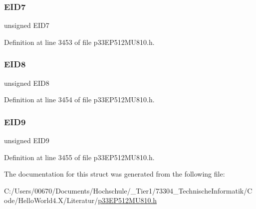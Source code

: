 \subsubsection{\texorpdfstring{E\+I\+D7}{EID7}}
{\footnotesize\ttfamily unsigned E\+I\+D7}



Definition at line 3453 of file p33\+E\+P512\+M\+U810.\+h.

\mbox{\label{structtag_c1_r_x_m0_e_i_d_b_i_t_s_acca25e0b7d86eb499d01f85222baea87}} 
\subsubsection{\texorpdfstring{E\+I\+D8}{EID8}}
{\footnotesize\ttfamily unsigned E\+I\+D8}



Definition at line 3454 of file p33\+E\+P512\+M\+U810.\+h.

\mbox{\label{structtag_c1_r_x_m0_e_i_d_b_i_t_s_ac6748f73d4ada8538b06548be4f396c2}} 
\subsubsection{\texorpdfstring{E\+I\+D9}{EID9}}
{\footnotesize\ttfamily unsigned E\+I\+D9}



Definition at line 3455 of file p33\+E\+P512\+M\+U810.\+h.



The documentation for this struct was generated from the following file\+:\begin{DoxyCompactItemize}
\item 
C\+:/\+Users/00670/\+Documents/\+Hochschule/\+\_\+\+Tier1/73304\+\_\+\+Technische\+Informatik/\+Code/\+Hello\+World4.\+X/\+Literatur/\hyperlink{p33_e_p512_m_u810_8h}{p33\+E\+P512\+M\+U810.\+h}\end{DoxyCompactItemize}
